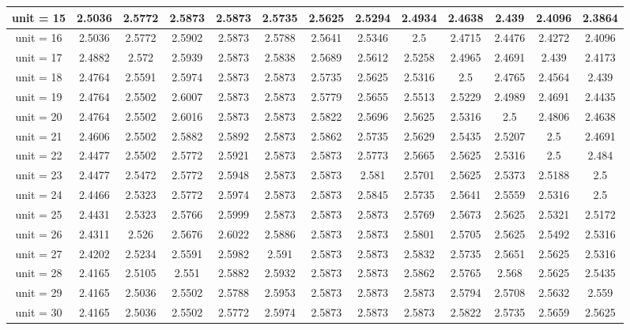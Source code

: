 \begin{table*}[ht]
\begin{tabular}{|c|c|c|c|c|c|c|c|c|c|c|c|c|}
\hline
unit = 15 &
2.5036 & 2.5772 & 2.5873 & 2.5873 & 2.5735 & 2.5625 & 2.5294 & 2.4934 & 2.4638 & 2.439 & 2.4096 & 2.3864 \\
\hline
unit = 16 &
2.5036 & 2.5772 & 2.5902 & 2.5873 & 2.5788 & 2.5641 & 2.5346 & 2.5 & 2.4715 & 2.4476 & 2.4272 & 2.4096 \\
\hline
unit = 17 &
2.4882 & 2.572 & 2.5939 & 2.5873 & 2.5838 & 2.5689 & 2.5612 & 2.5258 & 2.4965 & 2.4691 & 2.439 & 2.4173 \\
\hline
unit = 18 &
2.4764 & 2.5591 & 2.5974 & 2.5873 & 2.5873 & 2.5735 & 2.5625 & 2.5316 & 2.5 & 2.4765 & 2.4564 & 2.439 \\
\hline
unit = 19 &
2.4764 & 2.5502 & 2.6007 & 2.5873 & 2.5873 & 2.5779 & 2.5655 & 2.5513 & 2.5229 & 2.4989 & 2.4691 & 2.4435 \\
\hline
unit = 20 &
2.4764 & 2.5502 & 2.6016 & 2.5873 & 2.5873 & 2.5822 & 2.5696 & 2.5625 & 2.5316 & 2.5 & 2.4806 & 2.4638 \\
\hline
unit = 21 &
2.4606 & 2.5502 & 2.5882 & 2.5892 & 2.5873 & 2.5862 & 2.5735 & 2.5629 & 2.5435 & 2.5207 & 2.5 & 2.4691 \\
\hline
unit = 22 &
2.4477 & 2.5502 & 2.5772 & 2.5921 & 2.5873 & 2.5873 & 2.5773 & 2.5665 & 2.5625 & 2.5316 & 2.5 & 2.484 \\
\hline
unit = 23 &
2.4477 & 2.5472 & 2.5772 & 2.5948 & 2.5873 & 2.5873 & 2.581 & 2.5701 & 2.5625 & 2.5373 & 2.5188 & 2.5 \\
\hline
unit = 24 &
2.4466 & 2.5323 & 2.5772 & 2.5974 & 2.5873 & 2.5873 & 2.5845 & 2.5735 & 2.5641 & 2.5559 & 2.5316 & 2.5 \\
\hline
unit = 25 &
2.4431 & 2.5323 & 2.5766 & 2.5999 & 2.5873 & 2.5873 & 2.5873 & 2.5769 & 2.5673 & 2.5625 & 2.5321 & 2.5172 \\
\hline
unit = 26 &
2.4311 & 2.526 & 2.5676 & 2.6022 & 2.5886 & 2.5873 & 2.5873 & 2.5801 & 2.5705 & 2.5625 & 2.5492 & 2.5316 \\
\hline
unit = 27 &
2.4202 & 2.5234 & 2.5591 & 2.5982 & 2.591 & 2.5873 & 2.5873 & 2.5832 & 2.5735 & 2.5651 & 2.5625 & 2.5316 \\
\hline
unit = 28 &
2.4165 & 2.5105 & 2.551 & 2.5882 & 2.5932 & 2.5873 & 2.5873 & 2.5862 & 2.5765 & 2.568 & 2.5625 & 2.5435 \\
\hline
unit = 29 &
2.4165 & 2.5036 & 2.5502 & 2.5788 & 2.5953 & 2.5873 & 2.5873 & 2.5873 & 2.5794 & 2.5708 & 2.5632 & 2.559 \\
\hline
unit = 30 &
2.4165 & 2.5036 & 2.5502 & 2.5772 & 2.5974 & 2.5873 & 2.5873 & 2.5873 & 2.5822 & 2.5735 & 2.5659 & 2.5625 \\

\end{tabular}
\end{table*}
